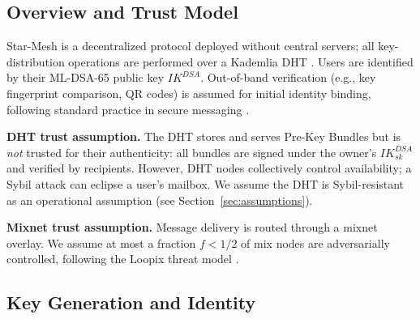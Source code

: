\documentclass[11pt,a4paper]{article}
\theoremstyle{remark}
\theoremstyle{plain}
\begin{document}
\subsection{Overview and Trust Model}
\label{sec:trust}

Star-Mesh is a decentralized protocol deployed without central servers; all key-distribution
operations are performed over a Kademlia DHT \cite{kademlia}.  Users are identified by their
ML-DSA-65 public key $IK^{DSA}$.  Out-of-band verification (e.g., key fingerprint comparison,
QR codes) is assumed for initial identity binding, following standard practice in secure
messaging \cite{marlinspike_x3dh}.

\textbf{DHT trust assumption.}  The DHT stores and serves Pre-Key Bundles but is \emph{not}
trusted for their authenticity: all bundles are signed under the owner's $IK^{DSA}_{sk}$ and
verified by recipients.  However, DHT nodes collectively control availability; a Sybil attack
can eclipse a user's mailbox.  We assume the DHT is Sybil-resistant as an operational
assumption (see Section~\ref{sec:assumptions}).

\textbf{Mixnet trust assumption.}  Message delivery is routed through a mixnet overlay.  We
assume at most a fraction $f < 1/2$ of mix nodes are adversarially controlled, following the
Loopix threat model \cite{loopix}.

\subsection{Key Generation and Identity}
\end{document}
